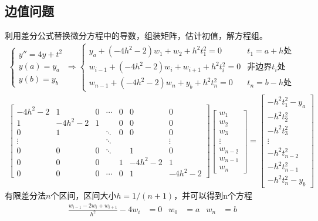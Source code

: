 \documentclass[twocolumn]{article}
\begin{document}
\subsection{边值问题}
利用差分公式替换微分方程中的导数，组装矩阵，估计初值，解方程组。
\begin{align*}
    \begin{cases}
        y''=4y+t^2 \\
        y(a)=y_a   \\
        y(b)=y_b
    \end{cases}
    \Rightarrow
    \begin{cases}
        y_a+(-4h^2-2)w_1+w_2+h^2t_1^2=0         & t_1=a+h\text{处}          \\
        w_{i-1}+(-4h^2-2)w_i+w_{i+1}+h^2t_i^2=0 & \text{非边界}t_i\text{处} \\
        w_{n-1}+(-4h^2-2)w_n+y_b+h^2t_n^2=0     & t_n=b-h\text{处}
    \end{cases} \\
    \begin{bmatrix}
        -4h^2-2 & 1       & 0 & \cdots & 0 & 0       & 0       \\
        1       & -4h^2-2 & 1 &        & 0 & 0       & 0       \\
        0       & 1       &   & \ddots & 0 & 0       & 0       \\
        \vdots  &         &   & \ddots &   &         & \vdots  \\
        0       & 0       & 0 & \ddots &   & 1       & 0       \\
        0       & 0       & 0 &        & 1 & -4h^2-2 & 1       \\
        0       & 0       & 0 & \cdots & 0 & 1       & -4h^2-2
    \end{bmatrix}
    \begin{bmatrix}
        w_1     \\
        w_2     \\
        w_3     \\
        \vdots  \\
        w_{n-2} \\
        w_{n-1} \\
        w_n
    \end{bmatrix}
    =
    \begin{bmatrix}
        -h^2t_1^2-y_a \\
        -h^2t_2^2     \\
        -h^2t_3^2     \\
        \vdots        \\
        -h^2t_{n-2}^2 \\
        -h^2t_{n-1}^2 \\
        -h^2t_n^2-y_b
    \end{bmatrix}
\end{align*}
有限差分法$n$个区间，区间大小$h=1/(n+1)$，并可以得到n个方程
\begin{align*}
    \frac{w_{i-1}-2w_i+w_{i+1}}{h^2}-4w_i & =0 & w_0 & =a & w_n & =b
\end{align*}
\end{document}
